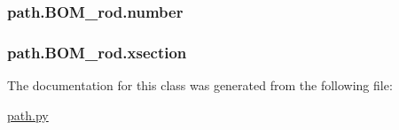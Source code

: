 \subsubsection[{number}]{\setlength{\rightskip}{0pt plus 5cm}path.\+B\+O\+M\+\_\+rod.\+number}\label{classpath_1_1_b_o_m__rod_a124a767902802b820af251b6c2c29af7}
\hypertarget{classpath_1_1_b_o_m__rod_ae8c232ca908c3b7d6a313c96cb158d48}{}
\subsubsection[{xsection}]{\setlength{\rightskip}{0pt plus 5cm}path.\+B\+O\+M\+\_\+rod.\+xsection}\label{classpath_1_1_b_o_m__rod_ae8c232ca908c3b7d6a313c96cb158d48}


The documentation for this class was generated from the following file\+:\begin{DoxyCompactItemize}
\item 
\hyperlink{path_8py}{path.\+py}\end{DoxyCompactItemize}
